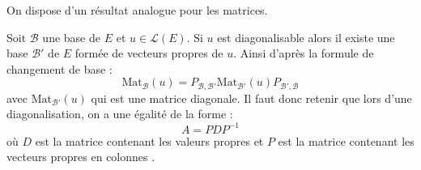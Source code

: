 \documentclass[a4paper,10pt]{report}
\begin{document}
\begin{preuve}
%
%
\end{preuve}

$\phantom{test}$

\vspace{9cm}

\begin{rems} 
\item On dispose d'un résultat analogue pour les matrices. 
\item Soit $\mathcal{B}$ une base de $E$ et $u \in \mathcal{L}(E)$. Si $u$ est diagonalisable alors il existe une base $\mathcal{B'}$ de $E$ formée de vecteurs propres de $u$. Ainsi d'après la formule de changement de base :
$$ \textrm{Mat}_{\mathcal{B}}(u) = P_{\mathcal{B}, \mathcal{B}'}  \textrm{Mat}_{\mathcal{B}'}(u) P_{\mathcal{B}', \mathcal{B}}$$
avec $\textrm{Mat}_{\mathcal{B}'}(u)$ qui est une matrice diagonale. Il faut donc retenir que lors d'une diagonalisation, on a une égalité de la forme :
$$ A = P D P^{-1}$$
où $D$ est la matrice contenant les valeurs propres et $P$ est la matrice contenant les vecteurs propres \og en colonnes \fg.
\end{rems}
\end{document}
